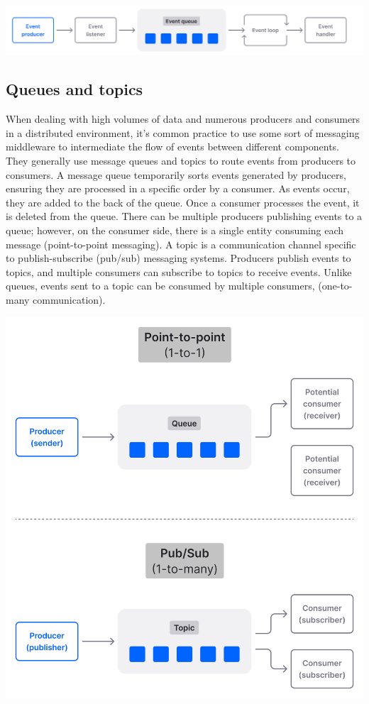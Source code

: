 \documentclass[twocolumn]{article}
\begin{document}
\begin{center}
     \includegraphics[width=\linewidth]{img/event_loop_overview.png}
\end{center}

\subsection{Queues and topics}

When dealing with high volumes of data and numerous producers and consumers in a distributed environment, it’s common practice to use some sort of messaging middleware to intermediate the flow of events between different components. They generally use message queues and topics to route events from producers to consumers.
A message queue temporarily sorts events generated by producers, ensuring they are processed in a specific order by a consumer. As events occur, they are added to the back of the queue. Once a consumer processes the event, it is deleted from the queue. There can be multiple producers publishing events to a queue; however, on the consumer side, there is a single entity consuming each message (point-to-point messaging).
A topic is a communication channel specific to publish-subscribe (pub/sub) messaging systems. Producers publish events to topics, and multiple consumers can subscribe to topics to receive events. Unlike queues, events sent to a topic can be consumed by multiple consumers, (one-to-many communication). \cite{quixWhatEventdriven}

\begin{center}
     \includegraphics[width=0.8\linewidth]{img/message_queues-topics.png}
\end{center}
\end{document}
